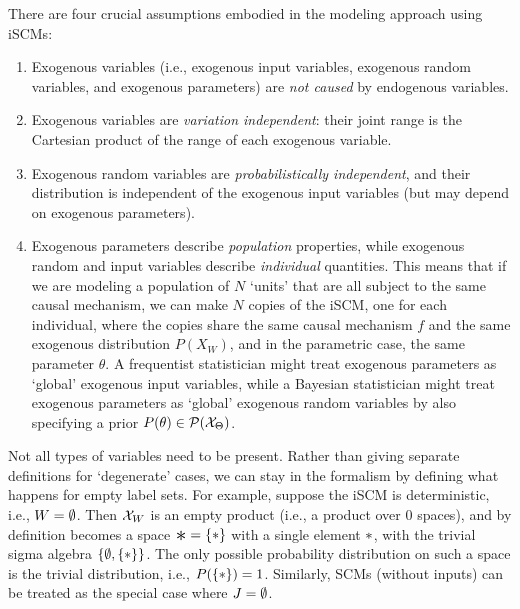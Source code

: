 \begin{Rem}
There are four crucial assumptions embodied in the modeling approach using iSCMs:
\begin{enumerate}
  \item Exogenous variables (i.e., exogenous input variables, exogenous random variables, and exogenous parameters) are \emph{not caused} by endogenous variables.
  \item Exogenous variables are \emph{variation independent}: their joint range is the Cartesian product of the range of each exogenous variable.
  \item Exogenous random variables are \emph{probabilistically independent}, and their distribution is independent of the exogenous input variables (but may depend on exogenous parameters).
  \item Exogenous parameters describe \emph{population} properties, while exogenous random and input variables describe \emph{individual} quantities.
    This means that if we are modeling a population of $N$ `units' that are all subject to the same causal mechanism, we can make $N$ copies of the iSCM, one for each individual, where the copies share the same causal mechanism $f$ and the same exogenous distribution $P(X_W)$, and in the parametric case, the same parameter $\theta$.
    A frequentist statistician might treat exogenous parameters as `global' exogenous input variables, while a Bayesian statistician might treat exogenous parameters as `global' exogenous random variables by also specifying a prior $P(\theta) \in \mathcal{P}(\mathcal{X}_{\Theta})$.
\end{enumerate}
\end{Rem}

\begin{Rem}
  Not all types of variables need to be present. Rather than giving separate definitions for `degenerate' cases, we can stay in the formalism by defining what happens for empty label sets. For example, suppose the iSCM is deterministic, i.e., $W = \emptyset$. Then $\mathcal{X}_{W}$ is an empty product (i.e., a product over 0 spaces), and by definition becomes a space $\Asterisk = \{\asterisk\}$ with a single element $*$, with the trivial sigma algebra $\{\emptyset,\{*\}\}$. The only possible probability distribution on such a space is the trivial distribution, i.e., $P(\{*\}) = 1$. Similarly, SCMs (without inputs) can be treated as the special case where $J=\emptyset$.
\end{Rem}

